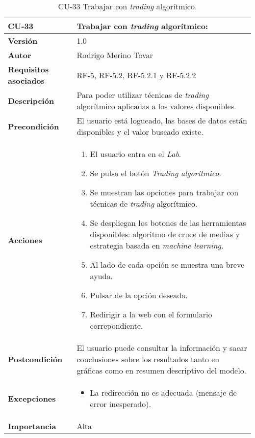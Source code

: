 \begin{table}[p]
	\centering
	\begin{tabularx}{\linewidth}{ p{} p{} }
		\toprule
		\textbf{CU-33}    & \textbf{Trabajar con \emph{trading} algorítmico:}\\
		\toprule
		\textbf{Versión}              & 1.0    \\
		\textbf{Autor}                & Rodrigo Merino Tovar \\
		\textbf{Requisitos asociados} & RF-5, RF-5.2, RF-5.2.1 y RF-5.2.2   \\
		\textbf{Descripción}          & Para poder utilizar técnicas de \emph{trading} algorítmico aplicadas a los valores disponibles.\\
		\textbf{Precondición}         & El usuario está logueado, las bases de datos están disponibles y el valor buscado existe.  \\
		\textbf{Acciones}             &
		\begin{enumerate}
			\def\labelenumi{\arabic{enumi}.}
			\tightlist 
			\item El usuario entra en el \emph{Lab}.
			\item Se pulsa el botón \emph{Trading algorítmico}.
			\item Se muestran las opciones para trabajar con técnicas de \emph{trading} algorítmico. 
			\item Se despliegan los botones de las herramientas disponibles: algoritmo de cruce de medias y estrategia basada en \emph{machine learning}.
			\item Al lado de cada opción se muestra una breve ayuda. 
			\item Pulsar de la opción deseada.
			\item Redirigir a la web con el formulario correpondiente. 
		\end{enumerate}\\
		\textbf{Postcondición}        & El usuario puede consultar la información y sacar conclusiones sobre los resultados tanto en gráficas como en resumen descriptivo del modelo. \\
		\textbf{Excepciones}          & 
		\begin{itemize}
			\tightlist
			\item La redirección no es adecuada (mensaje de error inesperado).
		\end{itemize} \\
		\textbf{Importancia}          & Alta \\
		\bottomrule
	\end{tabularx}
	\caption{CU-33 Trabajar con \emph{trading} algorítmico.}
\end{table}


